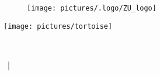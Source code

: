 
\begin{figure}[t]
	\flushright
	\texttt{[image: pictures/.logo/ZU\_logo]}
\end{figure}

\vspace*{3 cm}

\centering

\texttt{[image: pictures/tortoise]}




\centering {\Huge \Title}\\
\smallskip
\centering {\Large \Subtitle}


\vspace{\fill}


\centering \Name  ~| \Programme